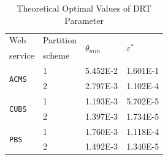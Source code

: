 \documentclass[10pt,journal,compsoc]{IEEEtran}
\begin{document}
\begin{table}
  \caption{Theoretical Optimal Values of DRT Parameter}
  \centering
  \label{tab:parameters}
  \begin{tabular}{llll} \toprule
     Web                         & Partition  &\multirow{2}{*}{$\theta_{min}$}   &\multirow{2}{*}{$\varepsilon^{*}$}    \\
     service                     & scheme     &                 &                \\ \midrule
     \multirow{2}{*}{\texttt{ACMS}}       &1           &5.452E-2         &1.601E-1        \\
                                 &2           &2.797E-3         &1.102E-4        \\ \midrule
     \multirow{2}{*}{\texttt{CUBS}}       &1           &1.193E-3         &5.702E-5        \\
                                 &2           &1.397E-3         &1.734E-5        \\ \midrule
     \multirow{2}{*}{\texttt{PBS}}        &1           &1.760E-3         &1.118E-4        \\ \
                                 &2           &1.492E-3         &1.340E-5        \\ \bottomrule
  \end{tabular}
\end{table}
\end{document}
